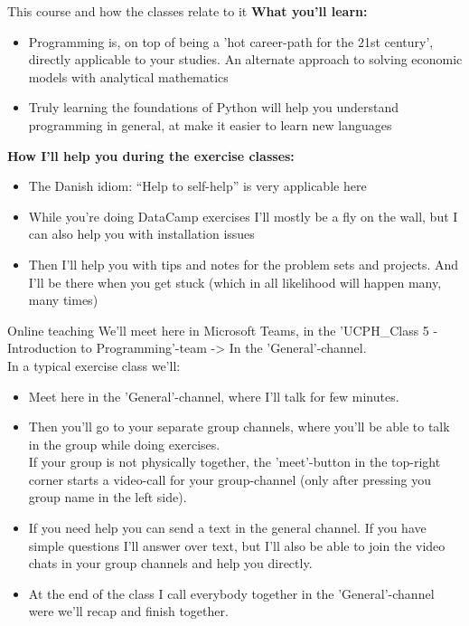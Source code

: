 \documentclass[10pt,danish,t,10pt]{beamer}
\begin{document}
\begin{frame}{This course and how the classes relate to it}
    \textbf{What you'll learn:}
    \begin{itemize}
        \item Programming is, on top of being a 'hot career-path for the 21st century', directly applicable to your studies. An alternate approach to solving economic models with analytical mathematics
        \item Truly learning the foundations of Python will help you understand programming in general, at make it easier to learn new languages
    \end{itemize} 
    \textbf{How I'll help you during the exercise classes:}
    \begin{itemize}
        \item The Danish idiom: ``Help to self-help'' is very applicable here
        \item While you're doing DataCamp exercises I'll mostly be a fly on the wall, but I can also help you with installation issues 
        \item Then I'll help you with tips and notes for the problem sets and projects. And I'll be there when you get stuck (which in all likelihood will happen many, many times) 
    \end{itemize}
\end{frame}

\begin{frame}{Online teaching}
    We'll meet here in Microsoft Teams, in the 'UCPH\_Class 5  - Introduction to Programming'-team -> In the 'General'-channel. \\
    In a typical exercise class we'll:
    \begin{itemize}
        \item Meet here in the 'General'-channel, where I'll talk for few minutes.
        \item Then you'll go to your separate group channels, where you'll be able to talk in the group while doing exercises. \\
        If your group is not physically together, the 'meet'-button in the top-right corner starts a video-call for your group-channel (only after pressing you group name in the left side).
        \item If you need help you can send a text in the general channel. If you have simple questions I'll answer over text, but I'll also be able to join the video chats in your group channels and help you directly. 
        \item At the end of the class I call everybody together in the 'General'-channel were we'll recap and finish together.
    \end{itemize}
\end{frame}
\end{document}
